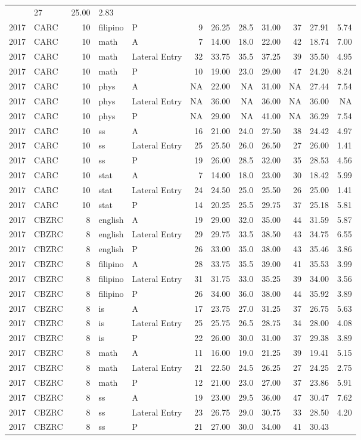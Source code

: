 \documentclass[]{article}
\begin{document}
\begin{longtable}[]{@{}rlrllrrrrrrr@{}}
& 27 & 25.00 & 2.83\tabularnewline
2017 & CARC & 10 & filipino & P & 9 & 26.25 & 28.5 & 31.00 & 37 & 27.91
& 5.74\tabularnewline
2017 & CARC & 10 & math & A & 7 & 14.00 & 18.0 & 22.00 & 42 & 18.74 &
7.00\tabularnewline
2017 & CARC & 10 & math & Lateral Entry & 32 & 33.75 & 35.5 & 37.25 & 39
& 35.50 & 4.95\tabularnewline
2017 & CARC & 10 & math & P & 10 & 19.00 & 23.0 & 29.00 & 47 & 24.20 &
8.24\tabularnewline
2017 & CARC & 10 & phys & A & NA & 22.00 & NA & 31.00 & NA & 27.44 &
7.54\tabularnewline
2017 & CARC & 10 & phys & Lateral Entry & NA & 36.00 & NA & 36.00 & NA &
36.00 & NA\tabularnewline
2017 & CARC & 10 & phys & P & NA & 29.00 & NA & 41.00 & NA & 36.29 &
7.54\tabularnewline
2017 & CARC & 10 & ss & A & 16 & 21.00 & 24.0 & 27.50 & 38 & 24.42 &
4.97\tabularnewline
2017 & CARC & 10 & ss & Lateral Entry & 25 & 25.50 & 26.0 & 26.50 & 27 &
26.00 & 1.41\tabularnewline
2017 & CARC & 10 & ss & P & 19 & 26.00 & 28.5 & 32.00 & 35 & 28.53 &
4.56\tabularnewline
2017 & CARC & 10 & stat & A & 7 & 14.00 & 18.0 & 23.00 & 30 & 18.42 &
5.99\tabularnewline
2017 & CARC & 10 & stat & Lateral Entry & 24 & 24.50 & 25.0 & 25.50 & 26
& 25.00 & 1.41\tabularnewline
2017 & CARC & 10 & stat & P & 14 & 20.25 & 25.5 & 29.75 & 37 & 25.18 &
5.81\tabularnewline
2017 & CBZRC & 8 & english & A & 19 & 29.00 & 32.0 & 35.00 & 44 & 31.59
& 5.87\tabularnewline
2017 & CBZRC & 8 & english & Lateral Entry & 29 & 29.75 & 33.5 & 38.50 &
43 & 34.75 & 6.55\tabularnewline
2017 & CBZRC & 8 & english & P & 26 & 33.00 & 35.0 & 38.00 & 43 & 35.46
& 3.86\tabularnewline
2017 & CBZRC & 8 & filipino & A & 28 & 33.75 & 35.5 & 39.00 & 41 & 35.53
& 3.99\tabularnewline
2017 & CBZRC & 8 & filipino & Lateral Entry & 31 & 31.75 & 33.0 & 35.25
& 39 & 34.00 & 3.56\tabularnewline
2017 & CBZRC & 8 & filipino & P & 26 & 34.00 & 36.0 & 38.00 & 44 & 35.92
& 3.89\tabularnewline
2017 & CBZRC & 8 & is & A & 17 & 23.75 & 27.0 & 31.25 & 37 & 26.75 &
5.63\tabularnewline
2017 & CBZRC & 8 & is & Lateral Entry & 25 & 25.75 & 26.5 & 28.75 & 34 &
28.00 & 4.08\tabularnewline
2017 & CBZRC & 8 & is & P & 22 & 26.00 & 30.0 & 31.00 & 37 & 29.38 &
3.89\tabularnewline
2017 & CBZRC & 8 & math & A & 11 & 16.00 & 19.0 & 21.25 & 39 & 19.41 &
5.15\tabularnewline
2017 & CBZRC & 8 & math & Lateral Entry & 21 & 22.50 & 24.5 & 26.25 & 27
& 24.25 & 2.75\tabularnewline
2017 & CBZRC & 8 & math & P & 12 & 21.00 & 23.0 & 27.00 & 37 & 23.86 &
5.91\tabularnewline
2017 & CBZRC & 8 & ss & A & 19 & 23.00 & 29.5 & 36.00 & 47 & 30.47 &
7.62\tabularnewline
2017 & CBZRC & 8 & ss & Lateral Entry & 23 & 26.75 & 29.0 & 30.75 & 33 &
28.50 & 4.20\tabularnewline
2017 & CBZRC & 8 & ss & P & 21 & 27.00 & 30.0 & 34.00 & 41 & 30.43 &

\end{longtable}
\end{document}
